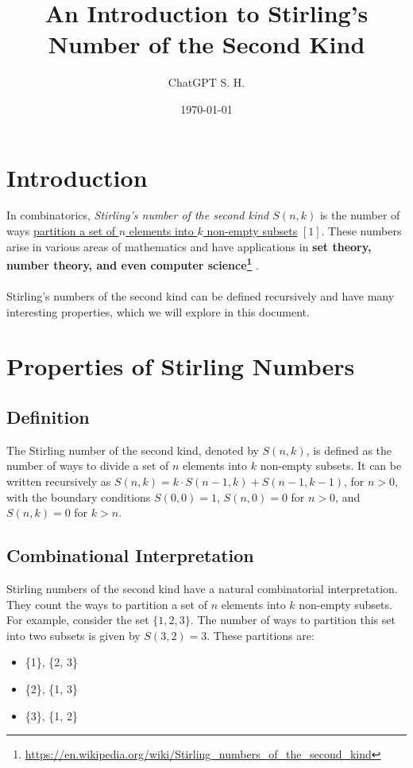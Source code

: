 \documentclass{article}
\title{An Introduction to Stirling’s Number of the
Second Kind}
\author{ChatGPT \And  S. H.}
\date{\today}
\begin{document}
\maketitle

\section{Introduction}

In combinatorics, \textit{Stirling’s number of the second kind \(S(n, k)\)}
   is the number
of ways \underline{partition a set of \( n \) elements into \( k \) non-empty subsets} \([1]\). These
numbers arise  in various areas of mathematics and have applications in 
\textbf{set theory, number theory, and even computer science\footnote{\url{https://en.wikipedia.org/wiki/Stirling_numbers_of_the_second_kind}} }.
\paragraph{}
Stirling’s numbers of the second kind can be defined recursively and have
many interesting properties, which we will explore in this document.


\section{ Properties of Stirling Numbers}

    \subsection{Definition}
    The Stirling number of the second kind, denoted by $S(n,k)$, is defined as the number of ways to divide a set of $n$ elements into $k$ non-empty subsets. It can be written recursively as $S(n,k) = k \cdot S(n-1,k) + S(n-1,k-1)$, for $n > 0$, with the boundary conditions $S(0,0) = 1$, $S(n,0) = 0$ for $n > 0$, and $S(n,k) = 0$ for $k > n$.

    \subsection{Combinational Interpretation}
    Stirling numbers of the second kind have a natural combinatorial interpretation. They count the ways to partition a set of $n$ elements into $k$ non-empty subsets. For example, consider the set $\{1,2,3\}$. The number of ways to partition this set into two subsets is given by $S(3,2) = 3$. These partitions are: 
    \newpage
    \begin{itemize}
        \item \{1\}, \{2, 3\}

    \item \{2\}, \{1, 3\}

 \item \{3\}, \{1, 2\}

    \end{itemize}
\end{document}
